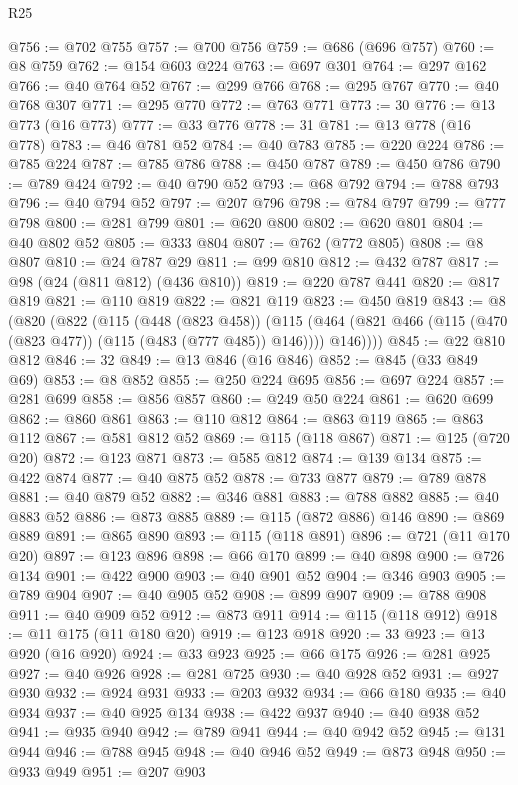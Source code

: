 \begin{lexlean}{R25}
\begin{coremodule}
@756 := @702 @755
@757 := @700 @756
@759 := @686 (@696 @757)
@760 := @8 @759
@762 := @154 @603 @224
@763 := @697 @301
@764 := @297 @162
@766 := @40 @764 @52
@767 := @299 @766
@768 := @295 @767
@770 := @40 @768 @307
@771 := @295 @770
@772 := @763 @771
@773 := 30
@776 := @13 @773 (@16 @773)
@777 := @33 @776
@778 := 31
@781 := @13 @778 (@16 @778)
@783 := @46 @781 @52
@784 := @40 @783
@785 := @220 @224
@786 := @785 @224
@787 := @785 @786
@788 := @450 @787
@789 := @450 @786
@790 := @789 @424
@792 := @40 @790 @52
@793 := @68 @792
@794 := @788 @793
@796 := @40 @794 @52
@797 := @207 @796
@798 := @784 @797
@799 := @777 @798
@800 := @281 @799
@801 := @620 @800
@802 := @620 @801
@804 := @40 @802 @52
@805 := @333 @804
@807 := @762 (@772 @805)
@808 := @8 @807
@810 := @24 @787 @29
@811 := @99 @810
@812 := @432 @787
@817 := @98 (@24 (@811 @812) (@436 @810))
@819 := @220 @787 @441
@820 := @817 @819
@821 := @110 @819
@822 := @821 @119
@823 := @450 @819
@843 := @8
    (@820
      (@822
        (@115
          (@448 (@823 @458))
          (@115 (@464 (@821 @466 (@115 (@470 (@823 @477)) (@115 (@483 (@777 @485)) @146)))) @146))))
@845 := @22 @810 @812
@846 := 32
@849 := @13 @846 (@16 @846)
@852 := @845 (@33 @849 @69)
@853 := @8 @852
@855 := @250 @224 @695
@856 := @697 @224
@857 := @281 @699
@858 := @856 @857
@860 := @249 @50 @224
@861 := @620 @699
@862 := @860 @861
@863 := @110 @812
@864 := @863 @119
@865 := @863 @112
@867 := @581 @812 @52
@869 := @115 (@118 @867)
@871 := @125 (@720 @20)
@872 := @123 @871
@873 := @585 @812
@874 := @139 @134
@875 := @422 @874
@877 := @40 @875 @52
@878 := @733 @877
@879 := @789 @878
@881 := @40 @879 @52
@882 := @346 @881
@883 := @788 @882
@885 := @40 @883 @52
@886 := @873 @885
@889 := @115 (@872 @886) @146
@890 := @869 @889
@891 := @865 @890
@893 := @115 (@118 @891)
@896 := @721 (@11 @170 @20)
@897 := @123 @896
@898 := @66 @170
@899 := @40 @898
@900 := @726 @134
@901 := @422 @900
@903 := @40 @901 @52
@904 := @346 @903
@905 := @789 @904
@907 := @40 @905 @52
@908 := @899 @907
@909 := @788 @908
@911 := @40 @909 @52
@912 := @873 @911
@914 := @115 (@118 @912)
@918 := @11 @175 (@11 @180 @20)
@919 := @123 @918
@920 := 33
@923 := @13 @920 (@16 @920)
@924 := @33 @923
@925 := @66 @175
@926 := @281 @925
@927 := @40 @926
@928 := @281 @725
@930 := @40 @928 @52
@931 := @927 @930
@932 := @924 @931
@933 := @203 @932
@934 := @66 @180
@935 := @40 @934
@937 := @40 @925 @134
@938 := @422 @937
@940 := @40 @938 @52
@941 := @935 @940
@942 := @789 @941
@944 := @40 @942 @52
@945 := @131 @944
@946 := @788 @945
@948 := @40 @946 @52
@949 := @873 @948
@950 := @933 @949
@951 := @207 @903

\end{coremodule}
\end{lexlean}
